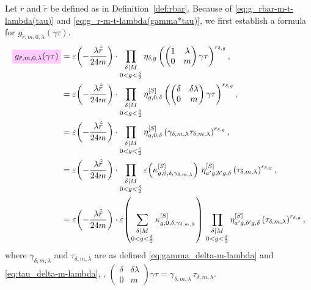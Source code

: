 \documentclass{article}
\begin{document}
Let $r$ and $\tilde{r}$ be defined as in Definition~\ref{def:rbar}.
Because of \eqref{eq:g_rbar-m-t-lambda(tau)} and
\eqref{eq:g_r-m-t-lambda(gamma*tau)}, we first establish a formula for
$g_{\tilde{r},m,0,\lambda}(\gamma\tau)$.
\begin{align}
  \defineNotation[g-rtilda-m-0-lambda]{g_{\tilde{r},m,0,\lambda}(\gamma\tau)}
  &=
  \unityPower{-\frac{\lambda \sumdelta{\tilde{r}}}{24m}}
  \cdot
  \prod_{\substack{\divides{\delta}{M}\\0 < g < \frac{\delta}{2}}}
  \eta_{\delta,g}
  \left(
  \begin{pmatrix}
    1 & \lambda\\
    0 & m
  \end{pmatrix}
  \gamma\tau
  \right)^{r_{\delta,g}},
  \notag\\
  &=
  \unityPower{-\frac{\lambda \sumdelta{\tilde{r}}}{24m}}
  \cdot
  \prod_{\substack{\divides{\delta}{M}\\0 < g < \frac{\delta}{2}}}
  \eta_{g,0,\delta}^{[S]}
  \left(
  \begin{pmatrix}
    \delta & \delta\lambda\\
    0 & m
  \end{pmatrix}
  \gamma\tau
  \right)^{r_{\delta,g}},
  \notag\\
  &=
  \unityPower{-\frac{\lambda \sumdelta{\tilde{r}}}{24m}}
  \cdot
  \prod_{\substack{\divides{\delta}{M}\\0 < g < \frac{\delta}{2}}}
  \eta_{g,0,\delta}^{[S]}
  \left(
  \gamma_{\delta,m,\lambda}\tau_{\delta,m,\lambda}
  \right)^{r_{\delta,g}},
  \notag\\
  &=
  \unityPower{-\frac{\lambda \sumdelta{\tilde{r}}}{24m}}
  \cdot
  \prod_{\substack{\divides{\delta}{M}\\0 < g < \frac{\delta}{2}}}
  \unityPower{\kappa_{g,0,\delta,\gamma_{\delta,m,\lambda}}^{[S]}} \,
  \eta_{a'g,b'g,\delta}^{[S]}
  \left(
  \tau_{\delta,m,\lambda}
  \right)^{r_{\delta,g}},
  \notag\\
  &=
  \unityPower{-\frac{\lambda \sumdelta{\tilde{r}}}{24m}}
  \cdot
  \unityPower{
    \sum_{\substack{\divides{\delta}{M}\\0 < g < \frac{\delta}{2}}}
    \kappa_{g,0,\delta,\gamma_{\delta,m,\lambda}}^{[S]}} \,
  \prod_{\substack{\divides{\delta}{M}\\0 < g < \frac{\delta}{2}}}
  \eta_{a'g,b'g,\delta}^{[S]}
  \left(
  \tau_{\delta,m,\lambda}
  \right)^{r_{\delta,g}},
  \label{eq:g_rtilde-m-0-lambda(gamma*tau)}
\end{align}
where $\gamma_{\delta,m,\lambda}$ and $\tau_{\delta,m,\lambda}$ are as
defined \eqref{eq:gamma_delta-m-lambda} and
\eqref{eq:tau_delta-m-lambda}, \ie,
$
\left(\begin{smallmatrix}
    \delta & \delta\lambda\\
    0 & m
\end{smallmatrix}\right)
\gamma\tau
=
\gamma_{\delta,m,\lambda}\,\tau_{\delta,m,\lambda}$.
\end{document}
